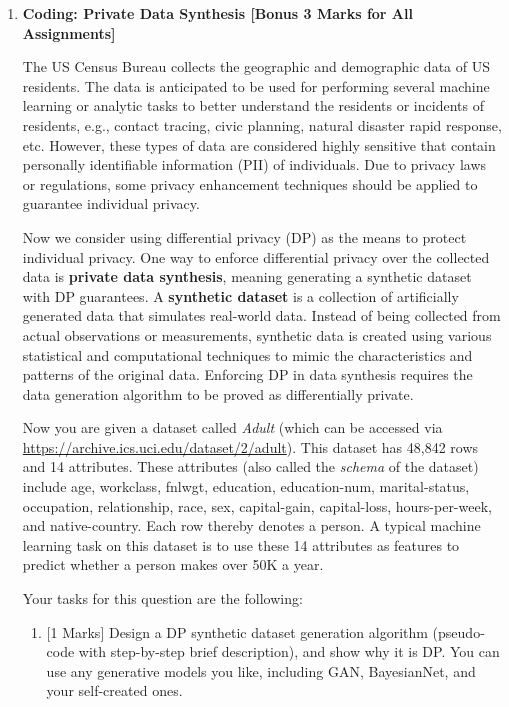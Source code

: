 \documentclass{article}
\newcommand{\0}{\mathbf{0}}
\newcommand{\1}{\mathbf{1}}
\begin{document}
\begin{enumerate}
\item \textbf{Coding: Private Data Synthesis [Bonus 3 Marks for All Assignments]}

The US Census Bureau collects the geographic and demographic data of US residents. 
The data is anticipated to be used for performing several machine learning or analytic tasks to better understand the residents or incidents of residents, e.g., contact tracing, civic planning, natural disaster rapid response, etc. 
However, these types of data are considered highly sensitive that contain personally identifiable information (PII) of individuals. 
Due to privacy laws or regulations, some privacy enhancement techniques should be applied to guarantee individual privacy.


Now we consider using differential privacy (DP) as the means to protect individual privacy.
One way to enforce differential privacy over the collected data is \textbf{private data synthesis}, meaning generating a synthetic dataset with DP guarantees.
A \textbf{synthetic dataset} is a collection of artificially generated data that simulates real-world data. Instead of being collected from actual observations or measurements, synthetic data is created using various statistical and computational techniques to mimic the characteristics and patterns of the original data.
Enforcing DP in data synthesis requires the data generation algorithm to be proved as differentially private.

Now you are given a dataset called \emph{Adult} (which can be accessed via \url{https://archive.ics.uci.edu/dataset/2/adult}).
This dataset has 48,842 rows and 14 attributes.
These attributes (also called the \emph{schema} of the dataset) include age, workclass, fnlwgt, education, education-num, marital-status, occupation, relationship, race, sex, capital-gain, capital-loss, hours-per-week, and native-country.
Each row thereby denotes a person.
A typical machine learning task on this dataset is to use these 14 attributes as features to predict whether a person makes over 50K a year.

Your tasks for this question are the following:

\begin{enumerate}
    \item {[1 Marks]} Design a DP synthetic dataset generation algorithm (pseudo-code with step-by-step brief description), and show why it is DP. You can use any generative models you like, including GAN, BayesianNet, and your self-created ones.


\end{enumerate}
\end{enumerate}
\end{document}
